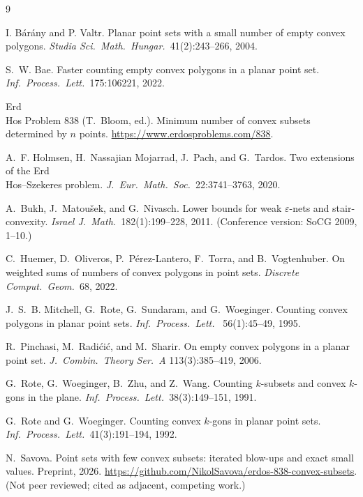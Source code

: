 \documentclass[11pt,a4paper]{article}
\theoremstyle{definition}
\begin{document}
\begin{thebibliography}{9}

 I. B\'ar\'any and P. Valtr. Planar point sets with a small number
of empty convex polygons. \emph{Studia Sci.\ Math.\ Hungar.\ }41(2):243--266, 2004.

 S.~W. Bae. Faster counting empty convex polygons in a planar point
set. \emph{Inf.\ Process.\ Lett.\ }175:106221, 2022.

 Erd{\\H{o}}s Problem 838 (T.~Bloom, ed.). Minimum number of convex subsets
determined by $n$ points. \url{https://www.erdosproblems.com/838}.

 A.~F. Holmsen, H.~Nassajian Mojarrad, J.~Pach, and G.~Tardos. Two
extensions of the Erd{\\H{o}}s--Szekeres problem. \emph{J.\ Eur.\ Math.\ Soc.\ }22:3741--3763, 2020.

 A.~Bukh, J.~Matou\v{s}ek, and G.~Nivasch. Lower bounds for weak
$\varepsilon$-nets and stair-convexity. \emph{Israel J.\ Math.\ }182(1):199--228, 2011.
(Conference version: SoCG 2009, 1--10.)

 C.~Huemer, D.~Oliveros, P.~P\'erez-Lantero, F.~Torra, and
B.~Vogtenhuber. On weighted sums of numbers of convex polygons in point sets.
\emph{Discrete Comput.\ Geom.\ }68, 2022.

 J.~S.~B. Mitchell, G.~Rote, G.~Sundaram, and G.~Woeginger.
Counting convex polygons in planar point sets. \emph{Inf.\ Process.\ Lett.\ }
56(1):45--49, 1995.

 R.~Pinchasi, M.~Radi\'ci\'c, and M.~Sharir. On empty convex
polygons in a planar point set. \emph{J.\ Combin.\ Theory Ser.\ A }113(3):385--419, 2006.

 G.~Rote, G.~Woeginger, B.~Zhu, and Z.~Wang. Counting $k$-subsets and
convex $k$-gons in the plane. \emph{Inf.\ Process.\ Lett.\ }38(3):149--151, 1991.

 G.~Rote and G.~Woeginger. Counting convex $k$-gons in planar point
sets. \emph{Inf.\ Process.\ Lett.\ }41(3):191--194, 1992.

 N.~Savova. Point sets with few convex subsets: iterated blow-ups
and exact small values. Preprint, 2026.
\url{https://github.com/NikolSavova/erdos-838-convex-subsets}.
(Not peer reviewed; cited as adjacent, competing work.)


\end{thebibliography}
\end{document}
